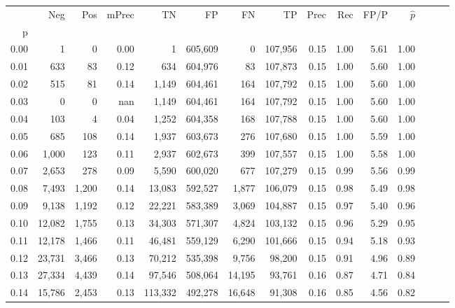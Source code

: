 \begin{tabular}{rrrrrrrrrrrrrrr}
\toprule
{} &     Neg &    Pos & mPrec &       TN &       FP &       FN &       TP &  Prec &   Rec &  FP/P & $\hat{p}$ \\
p    &         &        &       &          &          &          &          &       &       &       &           \\
\midrule
0.00 &       1 &      0 &  0.00 &        1 &  605,609 &        0 &  107,956 &  0.15 &  1.00 &  5.61 &      1.00 \\
0.01 &     633 &     83 &  0.12 &      634 &  604,976 &       83 &  107,873 &  0.15 &  1.00 &  5.60 &      1.00 \\
0.02 &     515 &     81 &  0.14 &    1,149 &  604,461 &      164 &  107,792 &  0.15 &  1.00 &  5.60 &      1.00 \\
0.03 &       0 &      0 &   nan &    1,149 &  604,461 &      164 &  107,792 &  0.15 &  1.00 &  5.60 &      1.00 \\
0.04 &     103 &      4 &  0.04 &    1,252 &  604,358 &      168 &  107,788 &  0.15 &  1.00 &  5.60 &      1.00 \\
0.05 &     685 &    108 &  0.14 &    1,937 &  603,673 &      276 &  107,680 &  0.15 &  1.00 &  5.59 &      1.00 \\
0.06 &   1,000 &    123 &  0.11 &    2,937 &  602,673 &      399 &  107,557 &  0.15 &  1.00 &  5.58 &      1.00 \\
0.07 &   2,653 &    278 &  0.09 &    5,590 &  600,020 &      677 &  107,279 &  0.15 &  0.99 &  5.56 &      0.99 \\
0.08 &   7,493 &  1,200 &  0.14 &   13,083 &  592,527 &    1,877 &  106,079 &  0.15 &  0.98 &  5.49 &      0.98 \\
0.09 &   9,138 &  1,192 &  0.12 &   22,221 &  583,389 &    3,069 &  104,887 &  0.15 &  0.97 &  5.40 &      0.96 \\
0.10 &  12,082 &  1,755 &  0.13 &   34,303 &  571,307 &    4,824 &  103,132 &  0.15 &  0.96 &  5.29 &      0.95 \\
0.11 &  12,178 &  1,466 &  0.11 &   46,481 &  559,129 &    6,290 &  101,666 &  0.15 &  0.94 &  5.18 &      0.93 \\
0.12 &  23,731 &  3,466 &  0.13 &   70,212 &  535,398 &    9,756 &   98,200 &  0.15 &  0.91 &  4.96 &      0.89 \\
0.13 &  27,334 &  4,439 &  0.14 &   97,546 &  508,064 &   14,195 &   93,761 &  0.16 &  0.87 &  4.71 &      0.84 \\
0.14 &  15,786 &  2,453 &  0.13 &  113,332 &  492,278 &   16,648 &   91,308 &  0.16 &  0.85 &  4.56 &      0.82 \\

\end{tabular}
